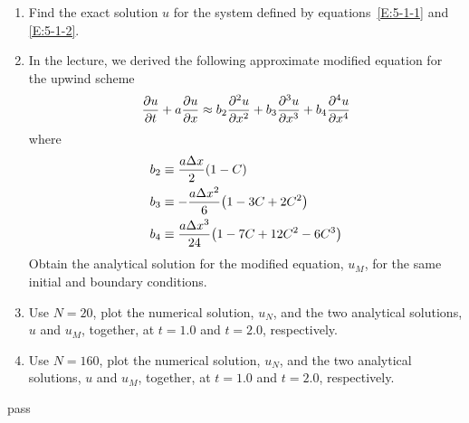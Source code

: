 \begin{homework}[label={H:5-1}]
    \begin{enumerate}[label=(\alph*)]
        \item Find the exact solution $u$ for the system defined by equations~\eqref{E:5-1-1} and \eqref{E:5-1-2}.
        \item In the lecture, we derived the following approximate modified equation for the upwind scheme
            \begin{equation}\label{E:5-1-4}
                \pdv{u}{t}+a\pdv{u}{x} \approx b_2\pdv[2]{u}{x}+b_3\pdv[3]{u}{x}+b_4\pdv[4]{u}{x}
            \end{equation}
            where
            \begin{equation}\label{E:5-1-5}
                \begin{aligned}
                    b_2 &\equiv \frac{a\Delta x}{2}\qty(1-C) \\
                    b_3 &\equiv -\frac{a\Delta x^2}{6}\qty(1-3C+2C^2) \\
                    b_4 &\equiv \frac{a\Delta x^3}{24}\qty(1-7C+12C^2-6C^3)
                \end{aligned}
            \end{equation}
            Obtain the analytical solution for the modified equation, $u_M$, for the same initial and boundary conditions.
        \item Use $N=20$, plot the numerical solution, $u_N$, and the two analytical solutions, $u$ and $u_M$, together, at $t=1.0$ and $t=2.0$, respectively.
        \item Use $N=160$, plot the numerical solution, $u_N$, and the two analytical solutions, $u$ and $u_M$, together, at $t=1.0$ and $t=2.0$, respectively.
    \end{enumerate}
\end{homework}

pass



